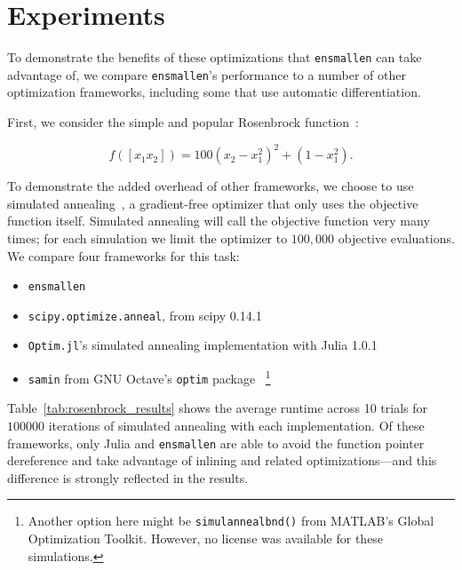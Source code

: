 \documentclass{article}
\begin{document}

\section{Experiments}

To demonstrate the benefits of these optimizations that {\tt ensmallen} can take
advantage of, we compare {\tt ensmallen}'s performance to a number of other
optimization frameworks, including some that use automatic differentiation.

First, we consider the simple and popular Rosenbrock
function~\cite{Rosenbrock1960}:

\begin{equation}
f([x_1 x_2]) = 100 (x_2 - x_1^2)^2 + (1 - x_1^2).
\end{equation}

To demonstrate the added overhead of other frameworks, we choose to use
simulated annealing~\cite{kirkpatrick1983optimization},
a gradient-free optimizer that only uses the objective function itself.
Simulated annealing will call the objective function very many times; for each
simulation we limit the optimizer to $100,000$ objective evaluations.  We
compare four frameworks for this task:

\begin{itemize}
  \item {\tt ensmallen}
  \item {\tt scipy.optimize.anneal}, from scipy 0.14.1~\cite{jones2014scipy}
  \item {\tt Optim.jl}'s simulated annealing implementation with Julia
1.0.1~\cite{mogensen2018optim}
  \item {\tt samin} from GNU Octave's {\tt optim} package~\cite{octave}
\footnote{Another option here might be {\tt simulannealbnd()} from MATLAB's
Global Optimization Toolkit.  However, no license was available for these
simulations.}
\end{itemize}

Table~\ref{tab:rosenbrock_results} shows the average runtime
across 10 trials for $100000$ iterations of simulated annealing with each
implementation.  Of these frameworks, only Julia and {\tt ensmallen} are able to
avoid the function pointer dereference and take advantage of inlining and
related optimizations---and this difference is strongly reflected in the
results.
\end{document}
